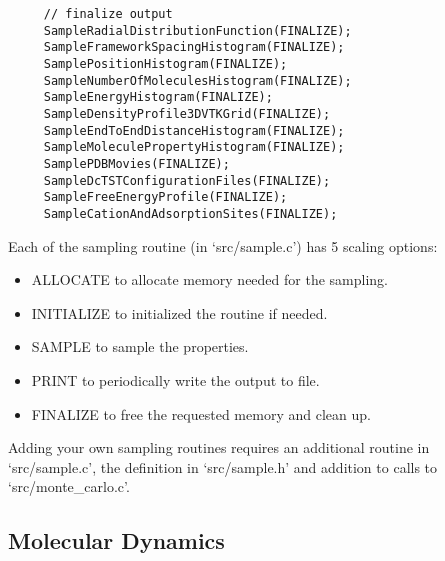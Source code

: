 \begin{footnotesize}
\begin{verbatim}
     // finalize output
     SampleRadialDistributionFunction(FINALIZE);
     SampleFrameworkSpacingHistogram(FINALIZE);
     SamplePositionHistogram(FINALIZE);
     SampleNumberOfMoleculesHistogram(FINALIZE);
     SampleEnergyHistogram(FINALIZE);
     SampleDensityProfile3DVTKGrid(FINALIZE);
     SampleEndToEndDistanceHistogram(FINALIZE);
     SampleMoleculePropertyHistogram(FINALIZE);
     SamplePDBMovies(FINALIZE);
     SampleDcTSTConfigurationFiles(FINALIZE);
     SampleFreeEnergyProfile(FINALIZE);
     SampleCationAndAdsorptionSites(FINALIZE);
\end{verbatim}
\end{footnotesize}
Each of the sampling routine (in `src/sample.c') has 5 scaling options: 
\begin{itemize}
 \item{ALLOCATE} to allocate memory needed for the sampling.
 \item{INITIALIZE} to initialized the routine if needed.
 \item{SAMPLE} to sample the properties.
 \item{PRINT} to periodically write the output to file.
 \item{FINALIZE} to free the requested memory and clean up.
\end{itemize}
Adding your own sampling routines requires an additional routine in `src/sample.c', the definition in `src/sample.h' and addition to 
calls to `src/monte\_carlo.c'.


\subsection{Molecular Dynamics}

